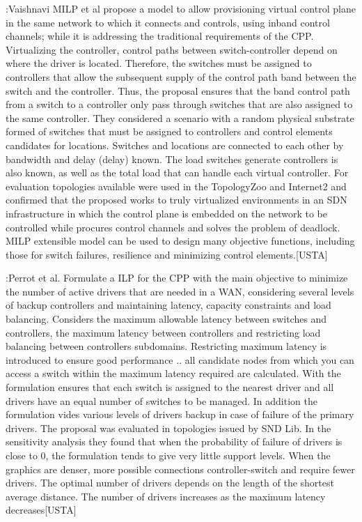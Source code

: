 \documentclass[a4paper,10pt]{article}
\begin{document}
\cite{VaPo17}:Vaishnavi MILP et al propose a model to allow provisioning virtual control plane in the same network to which it connects and controls, using inband control channels; while it is addressing the traditional requirements of the CPP. Virtualizing the controller, control paths between switch-controller depend on where the driver is located. Therefore, the switches must be assigned to controllers that allow the subsequent supply of the control path band between the switch and the controller. Thus, the proposal ensures that the band control path from a switch to a controller only pass through switches that are also assigned to the same controller.
They considered a scenario with a random physical substrate formed of switches that must be assigned to controllers and control elements candidates for locations. Switches and locations are connected to each other by bandwidth and delay (delay) known. The load switches generate controllers is also known, as well as the total load that can handle each virtual controller.
For evaluation topologies available were used in the TopologyZoo and Internet2 and confirmed that the proposed works to truly virtualized environments in an SDN infrastructure in which the control plane is embedded on the network to be controlled while procures control channels and solves the problem of deadlock. MILP extensible model can be used to design many objective functions, including those for switch failures, resilience and minimizing control elements.[USTA]



\cite{PeRe16}:Perrot et al. Formulate a ILP for the CPP with the main objective to minimize the number of active drivers that are needed in a WAN, considering several levels of backup controllers and maintaining latency, capacity constraints and load balancing. Considers the maximum allowable latency between switches and controllers, the maximum latency between controllers and restricting load balancing between controllers subdomains. Restricting maximum latency is introduced to ensure good performance .. all candidate nodes from which you can access a switch within the maximum latency required are calculated. With the formulation ensures that each switch is assigned to the nearest driver and all drivers have an equal number of switches to be managed. In addition the formulation vides various levels of drivers backup in case of failure of the primary drivers.
The proposal was evaluated in topologies issued by SND Lib. In the sensitivity analysis they found that when the probability of failure of drivers is close to 0, the formulation tends to give very little support levels. When the graphics are denser, more possible connections controller-switch and require fewer drivers. The optimal number of drivers depends on the length of the shortest average distance. The number of drivers increases as the maximum latency decreases[USTA]
\end{document}
